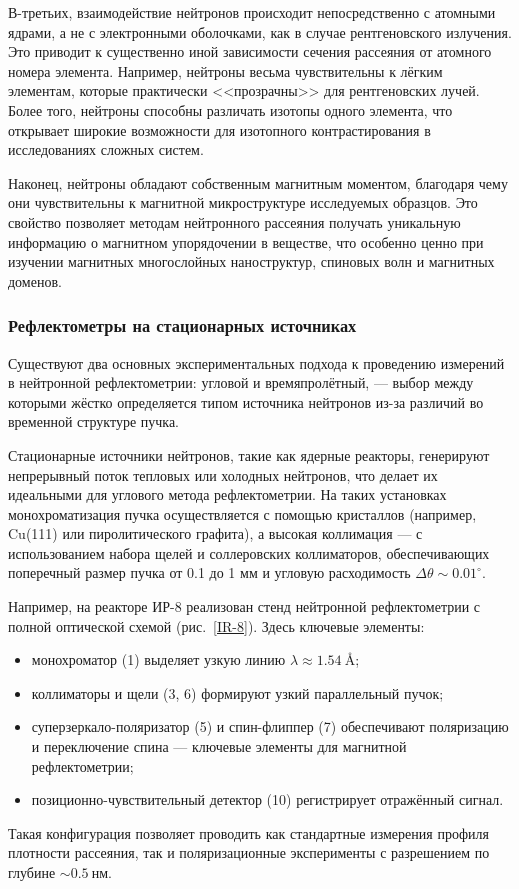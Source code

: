 \documentclass[a4paper]{article}
\begin{document}
В-третьих, взаимодействие нейтронов происходит непосредственно с атомными ядрами, а не с электронными оболочками, как в случае рентгеновского излучения. Это приводит к существенно иной зависимости сечения рассеяния от атомного номера элемента. Например, нейтроны весьма чувствительны к лёгким элементам, которые практически <<прозрачны>> для рентгеновских лучей. Более того, нейтроны способны различать изотопы одного элемента, что открывает широкие возможности для изотопного контрастирования в исследованиях сложных систем.

Наконец, нейтроны обладают собственным магнитным моментом, благодаря чему они чувствительны к магнитной микроструктуре исследуемых образцов. Это свойство позволяет методам нейтронного рассеяния получать уникальную информацию о магнитном упорядочении в веществе, что особенно ценно при изучении магнитных многослойных наноструктур, спиновых волн и магнитных доменов.

\subsubsection{Рефлектометры на стационарных источниках}
Существуют два основных экспериментальных подхода к проведению измерений в нейтронной рефлектометрии: угловой и времяпролётный, — выбор между которыми жёстко определяется типом источника нейтронов из-за различий во временной структуре пучка.

Стационарные источники нейтронов, такие как ядерные реакторы, генерируют непрерывный поток тепловых или холодных нейтронов, что делает их идеальными для углового метода рефлектометрии. На таких установках монохроматизация пучка осуществляется с помощью кристаллов (например, Cu(111) или пиролитического графита), а высокая коллимация — с использованием набора щелей и соллеровских коллиматоров, обеспечивающих поперечный размер пучка от 0.1 до 1 мм и угловую расходимость \(\Delta\theta \sim 0.01^\circ\).

Например, на реакторе ИР-8 реализован стенд нейтронной рефлектометрии с полной оптической схемой (рис.~\ref{IR-8}). Здесь ключевые элементы:
\begin{itemize}
    \item монохроматор (1) выделяет узкую линию \(\lambda \approx 1.54~\)Å;
    \item коллиматоры и щели (3, 6) формируют узкий параллельный пучок;
    \item суперзеркало-поляризатор (5) и спин-флиппер (7) обеспечивают поляризацию и переключение спина — ключевые элементы для магнитной рефлектометрии;
    \item позиционно-чувствительный детектор (10) регистрирует отражённый сигнал.
\end{itemize}
Такая конфигурация позволяет проводить как стандартные измерения профиля плотности рассеяния, так и поляризационные эксперименты с разрешением по глубине \(\sim 0.5~\text{нм}\).
\end{document}
